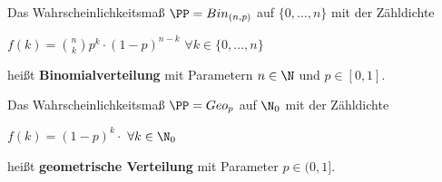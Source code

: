 Das Wahrscheinlichkeitsmaß $\PP=Bin_{(n,p)}$ auf $\{0,\ldots,n\}$ mit der Zähldichte\\
\begin{tightcenter}
	$f(k)=\binom{n}{k}p^k\cdot(1-p)^{n-k}$ \qquad$\forall k\in\{0,\ldots,n\}$
\end{tightcenter}
heißt \textbf{Binomialverteilung} mit Parametern $n\in\N$ und $p\in[0,1]$.

Das Wahrscheinlichkeitsmaß $\PP=Geo_p$ auf $\N_0$ mit der Zähldichte\\
\begin{tightcenter}
	$f(k)=(1-p)^k\cdotp$ \qquad$\forall k\in\N_0$
\end{tightcenter}
heißt \textbf{geometrische Verteilung} mit Parameter $p\in(0,1]$.
